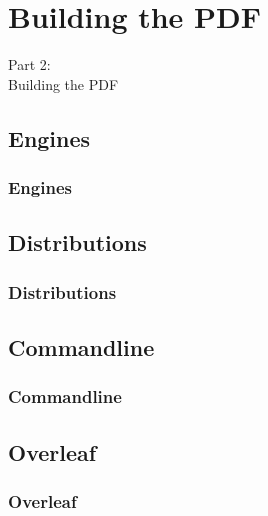 
{
\renewcommand{\bgcolor}{building}

\section{Building the PDF}
\begin{frame}
  \vspace{25mm}
  \begin{center}
    \Huge{Part 2:\\Building the PDF}
  \end{center}
\end{frame}

\subsection{Engines}
\begin{frame}[fragile]
  \frametitle{Engines}
  \vspace{3mm}
  
\end{frame}

\subsection{Distributions}
\begin{frame}[fragile]
  \frametitle{Distributions}
  \vspace{3mm}
  
\end{frame}

\subsection{Commandline}
\begin{frame}[fragile]
  \frametitle{Commandline}
  \vspace{3mm}
  
\end{frame}

\subsection{Overleaf}
\begin{frame}[fragile]
  \frametitle{Overleaf}
  \vspace{3mm}
  

\end{frame}}
